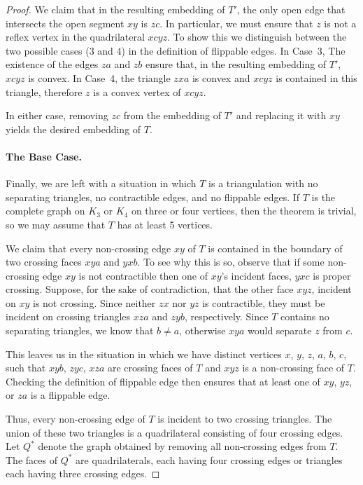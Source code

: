 \documentclass{patmorin}
\begin{document}
\begin{proof}
   We claim that in the resulting embedding of $T'$, the only open edge
   that intersects the open segment $xy$ is $zc$.  In particular, we must
   ensure that $z$ is not a reflex vertex in the quadrilateral $xcyz$.
   To show this we distinguish between the two possible cases (3 and 4)
   in the definition of flippable edges. In Case~3, The existence of the
   edges $za$ and $zb$ ensure that, in the resulting embedding of $T'$,
   $xcyz$ is convex.  In Case~4, the triangle $zxa$ is convex and $xcyz$
   is contained in this triangle, therefore $z$ is a convex vertex
   of $xcyz$.

   In either case, removing $zc$ from the embedding of $T'$ and replacing
   it with $xy$ yields the desired embedding of $T$.

   \paragraph{The Base Case.}

   Finally, we are left with a situation in which $T$ is a triangulation
   with no separating triangles, no contractible edges, and no flippable
   edges.  If $T$ is the complete graph on $K_3$ or $K_4$ on three or
   four vertices, then the theorem is trivial, so we may assume that $T$
   has at least 5 vertices.

   We claim that every non-crossing edge $xy$ of $T$ is contained in the
   boundary of two crossing faces $xya$ and $yxb$.  To see why this is so,
   observe that if some non-crossing edge $xy$ is not contractible then
   one of $xy$'s incident faces, $yxc$ is proper crossing.  Suppose, for
   the sake of contradiction, that the other face $xyz$, incident on $xy$
   is not crossing.  Since neither $zx$ nor $yz$ is contractible, they
   must be incident on crossing triangles $xza$ and $zyb$, respectively.
   Since $T$ contains no separating triangles, we know that $b\neq a$,
   otherwise $xya$ would separate $z$ from $c$.

   This leaves us in the situation in which we have distinct vertices $x$,
   $y$, $z$, $a$, $b$, $c$, such that $xyb$, $zyc$, $xza$ are crossing
   faces of $T$ and $xyz$ is a non-crossing face of $T$.  Checking the
   definition of flippable edge then ensures that at least one of $xy$,
   $yz$, or $za$ is a flippable edge.

   Thus, every non-crossing edge of $T$ is incident to two crossing
   triangles.  The union of these two triangles is a quadrilateral
   consisting of four crossing edges.  Let $Q^*$ denote the graph obtained
   by removing all non-crossing edges from $T$.  The faces of $Q^*$
   are quadrilaterals, each having four crossing edges or triangles each
   having three crossing edges.


\end{proof}
\end{document}

